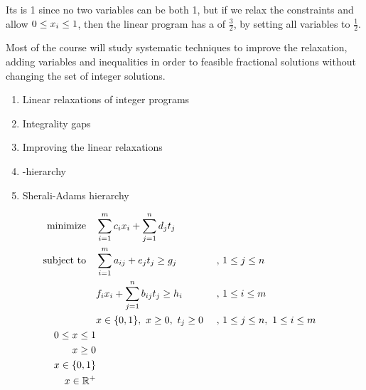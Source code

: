 \documentclass[a4paper,twoside,justified]{tufte-handout}
\begin{document}
Its  is 1 since no two variables can be
both 1, but if we relax the constraints and allow $ \varbounded{x_{i}}
$, then the linear program has a 
of $ \frac{3}{2} $, by setting all variables to $\frac{1}{2}$.

Most of the course will study systematic techniques to improve the
relaxation, adding variables and inequalities in order to
 feasible fractional solutions without changing
the set of integer solutions.

\begin{enumerate}
  \item Linear relaxations of integer programs
  \item Integrality gaps
  \item Improving the linear relaxations
  \item \Lovasz-\Schrijver hierarchy
  \item Sherali-Adams hierarchy
\end{enumerate}

\newpage

\begin{alignat*}{2}
    \minimize  \sum_{i=1}^m c_i x_i + \sum_{j=1}^n d_j t_j\  \\
    \subjectto \sum_{i=1}^m a_{ij} + e_j t_j \geq g_j &,\ & 1\leq j\leq n\\
                       & f_i x_i + \sum_{j=1}^n b_{ij}t_j \geq h_i\ &,\ & 1\leq i\leq m\\
                       & \varboolean{x},\ x\geq 0,\ t_j\geq 0\ &,\ &
                       1\leq j\leq n,\ 1\leq i\leq m \\
     \varbounded{x}\\
\varpositive{x}\\
\varboolean{x}\\
\vardomain{x}{\Rp}
\end{alignat*}





\end{document}
